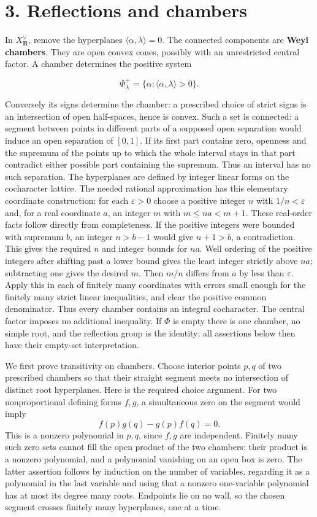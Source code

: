 \documentclass[11pt,a4paper,openany]{report}
\begin{document}
\section{3. Reflections and chambers}\label{AG-RG-04-reflections-and-chambers}

In \(X^\vee_\mathbf R\), remove the hyperplanes \(\langle\alpha,\lambda\rangle=0\). The connected components are \textbf{Weyl chambers}. They are open convex cones, possibly with an unrestricted central factor. A chamber determines the positive system

\[
\Phi^+_\lambda=\{\alpha:\langle\alpha,\lambda\rangle>0\}.
\tag{3.1}
\]

Conversely its signs determine the chamber: a prescribed choice of strict signs is an intersection of open half-spaces, hence is convex. Such a set is connected: a segment between points in different parts of a supposed open separation would induce an open separation of \([0,1]\). If its first part contains zero, openness and the supremum of the points up to which the whole interval stays in that part contradict either possible part containing the supremum. Thus an interval has no such separation. The hyperplanes are defined by integer linear forms on the cocharacter lattice. The needed rational approximation has this elementary coordinate construction: for each \(\varepsilon>0\) choose a positive integer \(n\) with \(1/n<\varepsilon\) and, for a real coordinate \(a\), an integer \(m\) with \(m\leq na<m+1\). These real-order facts follow directly from completeness. If the positive integers were bounded with supremum \(b\), an integer \(n>b-1\) would give \(n+1>b\), a contradiction. This gives the required \(n\) and integer bounds for \(na\). Well ordering of the positive integers after shifting past a lower bound gives the least integer strictly above \(na\); subtracting one gives the desired \(m\). Then \(m/n\) differs from \(a\) by less than \(\varepsilon\). Apply this in each of finitely many coordinates with errors small enough for the finitely many strict linear inequalities, and clear the positive common denominator. Thus every chamber contains an integral cocharacter. The central factor imposes no additional inequality. If \(\Phi\) is empty there is one chamber, no simple root, and the reflection group is the identity; all assertions below then have their empty-set interpretation.

We first prove transitivity on chambers. Choose interior points \(p,q\) of two prescribed chambers so that their straight segment meets no intersection of distinct root hyperplanes. Here is the required choice argument. For two nonproportional defining forms \(f,g\), a simultaneous zero on the segment would imply \[
                       f(p)g(q)-g(p)f(q)=0.
\] This is a nonzero polynomial in \(p,q\), since \(f,g\) are independent. Finitely many such zero sets cannot fill the open product of the two chambers: their product is a nonzero polynomial, and a polynomial vanishing on an open box is zero. The latter assertion follows by induction on the number of variables, regarding it as a polynomial in the last variable and using that a nonzero one-variable polynomial has at most its degree many roots. Endpoints lie on no wall, so the chosen segment crosses finitely many hyperplanes, one at a time.
\end{document}
